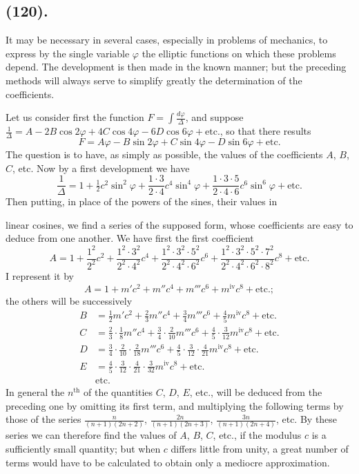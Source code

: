 \documentclass{article}
\begin{document}
\subsection*{(120).}

It may be necessary in several cases, especially in problems of mechanics, to express by the single variable $\varphi$ the elliptic functions on which these problems depend. The development is then made in the known manner; but the preceding methods will always serve to simplify greatly the determination of the coefficients.

Let us consider first the function $F=\displaystyle\int\frac{d\varphi}{\Delta}$, and suppose $\frac{1}{\Delta}=A-2B\cos2\varphi+4C\cos4\varphi-6D\cos6\varphi+\text{etc.}$, so that there results
\[ F=A\varphi-B\sin2\varphi+C\sin4\varphi-D\sin6\varphi+\text{etc.} \]
The question is to have, as simply as possible, the values of the coefficients $A$, $B$, $C$, etc. Now by a first development we have
\[ \frac{1}{\Delta}=1+\tfrac{1}{2}c^{2}\sin^{2}\varphi+\frac{1\cdot3}{2\cdot4}c^{4}\sin^{4}\varphi+\frac{1\cdot3\cdot5}{2\cdot4\cdot6}c^{6}\sin^{6}\varphi+\text{etc.} \]
Then putting, in place of the powers of the sines, their values in

linear cosines, we find a series of the supposed form, whose coefficients are easy to deduce from one another. We have first the first coefficient
\[ A=1+\frac{1^{2}}{2^{2}}c^{2}+\frac{1^{2}\cdot3^{2}}{2^{2}\cdot4^{2}}c^{4}+\frac{1^{2}\cdot3^{2}\cdot5^{2}}{2^{2}\cdot4^{2}\cdot6^{2}}c^{6}+\frac{1^{2}\cdot3^{2}\cdot5^{2}\cdot7^{2}}{2^{2}\cdot4^{2}\cdot6^{2}\cdot8^{2}}c^{8}+\text{etc.} \]
I represent it by
\[ A=1+m'c^{2}+m''c^{4}+m'''c^{6}+m^{\text{iv}}c^{8}+\text{etc.}; \]
the others will be successively
\[ \begin{aligned} B&=\tfrac{1}{2}m'c^{2}+\tfrac{2}{3}m''c^{4}+\tfrac{3}{4}m'''c^{6}+\tfrac{4}{5}m^{\text{iv}}c^{8}+\text{etc.}\\ C&=\tfrac{2}{3}\cdot\tfrac{1}{8}m''c^{4}+\tfrac{3}{4}\cdot\tfrac{2}{10}m'''c^{6}+\tfrac{4}{5}\cdot\tfrac{3}{12}m^{\text{iv}}c^{8}+\text{etc.}\\ D&=\tfrac{3}{4}\cdot\tfrac{2}{10}\cdot\tfrac{2}{18}m'''c^{6}+\tfrac{4}{5}\cdot\tfrac{3}{12}\cdot\tfrac{4}{21}m^{\text{iv}}c^{8}+\text{etc.}\\ E&=\tfrac{4}{5}\cdot\tfrac{3}{12}\cdot\tfrac{4}{21}\cdot\tfrac{3}{32}m^{\text{iv}}c^{8}+\text{etc.}\\ &\text{etc.} \end{aligned} \]
In general the $n^{\text{th}}$ of the quantities $C$, $D$, $E$, etc., will be deduced from the preceding one by omitting its first term, and multiplying the following terms by those of the series $\frac{n}{(n+1)(2n+2)}$, $\frac{2n}{(n+1)(2n+3)}$, $\frac{3n}{(n+1)(2n+4)}$, etc. By these series we can therefore find the values of $A$, $B$, $C$, etc., if the modulus $c$ is a sufficiently small quantity; but when $c$ differs little from unity, a great number of terms would have to be calculated to obtain only a mediocre approximation.
\end{document}
